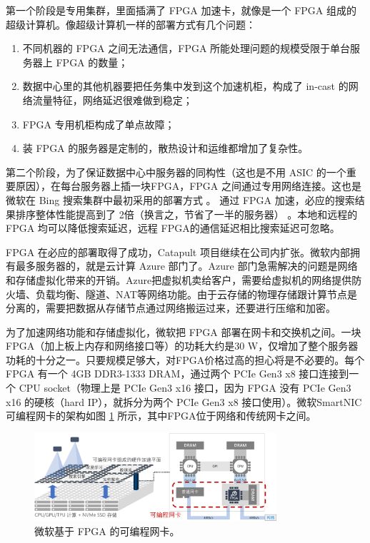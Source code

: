第一个阶段是专用集群，里面插满了 FPGA 加速卡，就像是一个 FPGA 组成的超级计算机。像超级计算机一样的部署方式有几个问题：

\begin{enumerate}
	\item 不同机器的 FPGA 之间无法通信，FPGA 所能处理问题的规模受限于单台服务器上 FPGA 的数量；
	\item 数据中心里的其他机器要把任务集中发到这个加速机柜，构成了 in-cast 的网络流量特征，网络延迟很难做到稳定；
	\item FPGA 专用机柜构成了单点故障；
	\item 装 FPGA 的服务器是定制的，散热设计和运维都增加了复杂性。
\end{enumerate}

第二个阶段，为了保证数据中心中服务器的同构性（这也是不用 ASIC 的一个重要原因），在每台服务器上插一块FPGA，FPGA 之间通过专用网络连接。这也是微软在 Bing 搜索集群中最初采用的部署方式 \cite{putnam2014reconfigurable}。
通过 FPGA 加速，必应的搜索结果排序整体性能提高到了 2倍（换言之，节省了一半的服务器） \cite{putnam2014reconfigurable}。本地和远程的 FPGA 均可以降低搜索延迟，远程 FPGA的通信延迟相比搜索延迟可忽略。

FPGA 在必应的部署取得了成功，Catapult 项目继续在公司内扩张。微软内部拥有最多服务器的，就是云计算 Azure 部门了。Azure 部门急需解决的问题是网络和存储虚拟化带来的开销。Azure把虚拟机卖给客户，需要给虚拟机的网络提供防火墙、负载均衡、隧道、NAT等网络功能。由于云存储的物理存储跟计算节点是分离的，需要把数据从存储节点通过网络搬运过来，还要进行压缩和加密。

为了加速网络功能和存储虚拟化，微软把 FPGA 部署在网卡和交换机之间。一块 FPGA（加上板上内存和网络接口等）的功耗大约是30 W，仅增加了整个服务器功耗的十分之一。只要规模足够大，对FPGA价格过高的担心将是不必要的。每个 FPGA 有一个 4GB DDR3-1333 DRAM，通过两个 PCIe Gen3 x8 接口连接到一个 CPU socket（物理上是 PCIe Gen3 x16 接口，因为 FPGA 没有 PCIe Gen3 x16 的硬核（hard IP），就拆分为两个 PCIe Gen3 x8 接口使用）。微软SmartNIC可编程网卡的架构如图 \ref{background:fig:azure_fpga} 所示，其中FPGA位于网络和传统网卡之间。

\begin{figure}[htbp]
	\centering
	\includegraphics[width=0.8\textwidth]{figures/azure_fpga.pdf}
	\caption{微软基于 FPGA 的可编程网卡。}
	\label{background:fig:azure_fpga}
\end{figure}

